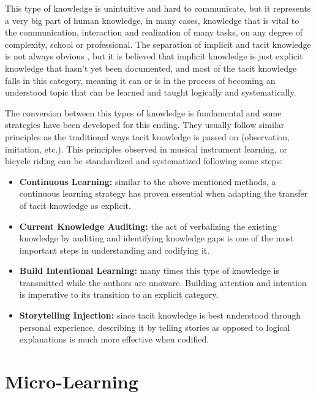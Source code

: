 This type of knowledge is unintuitive and hard to communicate, but it represents a 
very big part of human knowledge, in many cases, knowledge that is vital to the 
communication, interaction and realization of many tasks, on any degree of complexity,
school or professional. The separation of implicit and tacit knowledge is not always
obvious \cite{troublewithtacitknowledge}, but it is believed that implicit knowledge
is just explicit knowledge that hasn't yet been documented, and most of the tacit 
knowledge falls in this category, meaning it can or is in the process of becoming an
understood topic that can be learned and taught logically and systematically.

The conversion between this types of knowledge is fundamental and some strategies 
have been developed for this ending. They usually follow similar principles as the 
traditional ways tacit knowledge is passed on (observation, imitation, etc.). This
principles observed in musical instrument learning, or bicycle riding can be 
standardized and systematized following some steps:

\begin{itemize}
    \item \textbf{Continuous Learning:} similar to the above mentioned methods, 
        a continuous learning strategy has proven essential when adapting the transfer
        of tacit knowledge as explicit.
    \item \textbf{Current Knowledge Auditing:}
        the act of verbalizing the existing knowledge by auditing and identifying 
        knowledge gaps is one of the most important steps in understanding and 
        codifying it.
    \item \textbf{Build Intentional Learning:}
        many times this type of knowledge is transmitted while the authors are 
        unaware. Building attention and intention is imperative to its transition to
        an explicit category.
    \item \textbf{Storytelling Injection:}
        since tacit knowledge is best understood through personal experience, 
        describing it by telling stories as opposed to logical explanations 
        is much more effective when codified.
\end{itemize}



\section{Micro-Learning}
\label{section:micro}

